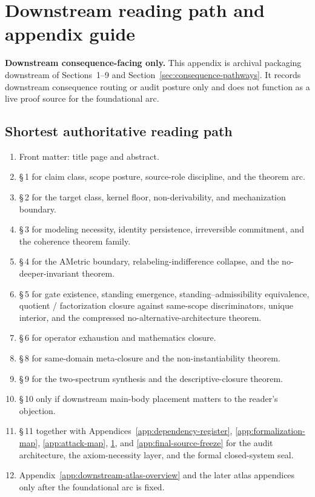 \section{Downstream reading path and appendix guide}
\label{app:reading-path}
\begin{fixedbox}
\textbf{Downstream consequence-facing only.} This appendix is archival packaging downstream of Sections~1--9 and Section~\ref{sec:consequence-pathways}. It records downstream consequence routing or audit posture only and does not function as a live proof source for the foundational arc.
\end{fixedbox}

\subsection*{Shortest authoritative reading path}

\begin{enumerate}
  \item Front matter: title page and abstract.
  \item \S\,1 for claim class, scope posture, source-role discipline, and the theorem arc.
  \item \S\,2 for the target class, kernel floor, non-derivability, and mechanization boundary.
  \item \S\,3 for modeling necessity, identity persistence, irreversible commitment, and the coherence theorem family.
  \item \S\,4 for the AMetric boundary, relabeling-indifference collapse, and the no-deeper-invariant theorem.
  \item \S\,5 for gate existence, standing emergence, standing--admissibility equivalence, quotient / factorization closure against same-scope discriminators, unique interior, and the compressed no-alternative-architecture theorem.
  \item \S\,6 for operator exhaustion and mathematics closure.
  \item \S\,8 for same-domain meta-closure and the non-instantiability theorem.
  \item \S\,9 for the two-spectrum synthesis and the descriptive-closure theorem.
  \item \S\,10 only if downstream main-body placement matters to the reader's objection.
  \item \S\,11 together with Appendices~\ref{app:dependency-register}, \ref{app:formalization-map}, \ref{app:attack-map}, \ref{app:reading-path}, and \ref{app:final-source-freeze} for the audit architecture, the axiom-necessity layer, and the formal closed-system seal.
  \item Appendix~\ref{app:downstream-atlas-overview} and the later atlas appendices only after the foundational arc is fixed.
\end{enumerate}

